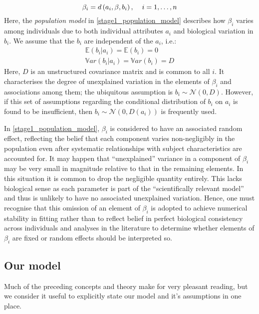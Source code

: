 \documentclass[11pt]{article} %
\begin{document}
\begin{equation} \label{stage1_population_model}
\beta_i = d\left(a_i,\beta,b_i\right), \hspace{4mm} i = 1,\ldots,n
\end{equation}
Here, the \emph{population model} in \eqref{stage1_population_model} describes how $\beta_i$ varies among individuals due to both individual attributes $a_i$ and biological variation in $b_i$. We assume that the $b_i$ are independent of the $a_i$, i.e.:
\begin{equation}
\begin{array}{l}
\mathbb{E}(b_i|a_i) = \mathbb{E}(b_i) = 0 \\
\mathbb{V}ar(b_i|a_i) = \mathbb{V}ar(b_i) = D
\end{array}
\end{equation}
Here, $D$ is an unstructured covariance matrix and is common to all $i$. It characterises the degree of unexplained variation in the elements of $\beta_i$ and associations among them; the ubiquitous assumption is $b_i \sim \mathcal{N}(0,D)$. However, if this set of assumptions regarding the conditional distribution of $b_i$ on $a_i$ is found to be insufficient, then $b_i \sim \mathcal{N}\left(0,D(a_i)\right)$ is frequently used.

In \eqref{stage1_population_model}, $\beta_i$ is considered to have an associated random effect, reflecting the belief that each component varies non-negligibly in the population even after systematic relationships with subject characteristics are accounted for. It may happen that ``unexplained'' variance in a component of $\beta_i$ may be very small in magnitude relative to that in the remaining elements. In this situation it is common to drop the negligible quantity entirely. This lacks biological sense as each parameter is part of the ``scientifically relevant model'' and thus is unlikely to have no associated unexplained variation. Hence, one must recognise that this omission of an element of $\beta_i$ is adopted to achieve numerical stability in fitting rather than to reflect belief in perfect biological consistency across individuals and analyses in the literature to determine whether elements of $\beta_i$ are fixed or random effects should be interpreted so.

\subsection{Our model}
Much of the preceding concepts and theory make for very pleasant reading, but we consider it useful to explicitly state our model and it's assumptions in one place.
\end{document}
